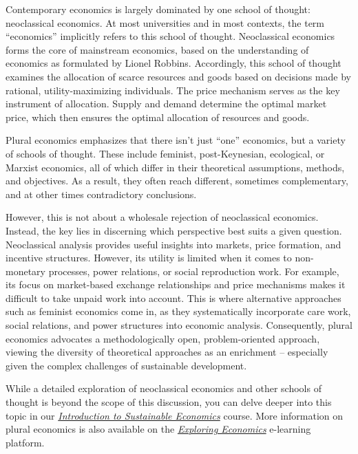 \documentclass[
  a4paper,
  DIV=11,
  numbers=noendperiod,
  oneside,
  openany]{scrreprt}
\begin{document}
\begin{tcolorbox}[enhanced jigsaw, arc=.35mm, bottomrule=.15mm, bottomtitle=1mm, breakable, colback=white, colbacktitle=quarto-callout-note-color!10!white, colframe=quarto-callout-note-color-frame, coltitle=black, left=2mm, leftrule=.75mm, opacityback=0, opacitybacktitle=0.6, rightrule=.15mm, title={Plural economics}, titlerule=0mm, toprule=.15mm, toptitle=1mm]

Contemporary economics is largely dominated by one school of thought:
neoclassical economics. At most universities and in most contexts, the
term ``economics'' implicitly refers to this school of thought.
Neoclassical economics forms the core of mainstream economics, based on
the understanding of economics as formulated by Lionel Robbins.
Accordingly, this school of thought examines the allocation of scarce
resources and goods based on decisions made by rational,
utility-maximizing individuals. The price mechanism serves as the key
instrument of allocation. Supply and demand determine the optimal market
price, which then ensures the optimal allocation of resources and goods.

Plural economics emphasizes that there isn't just ``one'' economics, but
a variety of schools of thought. These include feminist, post-Keynesian,
ecological, or Marxist economics, all of which differ in their
theoretical assumptions, methods, and objectives. As a result, they
often reach different, sometimes complementary, and at other times
contradictory conclusions.

However, this is not about a wholesale rejection of neoclassical
economics. Instead, the key lies in discerning which perspective best
suits a given question. Neoclassical analysis provides useful insights
into markets, price formation, and incentive structures. However, its
utility is limited when it comes to non-monetary processes, power
relations, or social reproduction work. For example, its focus on
market-based exchange relationships and price mechanisms makes it
difficult to take unpaid work into account. This is where alternative
approaches such as feminist economics come in, as they systematically
incorporate care work, social relations, and power structures into
economic analysis. Consequently, plural economics advocates a
methodologically open, problem-oriented approach, viewing the diversity
of theoretical approaches as an enrichment -- especially given the
complex challenges of sustainable development.

While a detailed exploration of neoclassical economics and other schools
of thought is beyond the scope of this discussion, you can delve deeper
into this topic in our
\href{https://cdeteaching.github.io/SP_SustainableEconomics/}{\emph{Introduction
to Sustainable Economics}} course. More information on plural economics
is also available on the
\href{https://www.exploring-economics.org/en/}{\emph{Exploring
Economics}} e-learning platform.


\end{tcolorbox}
\end{document}
